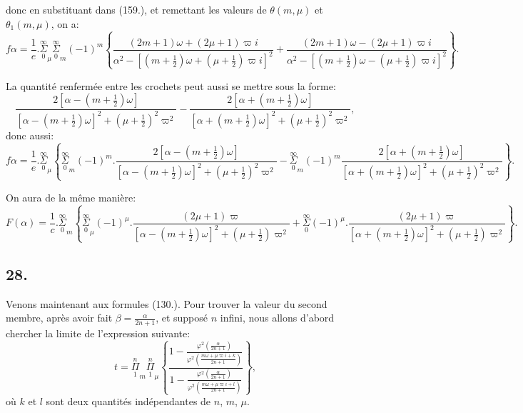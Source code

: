 \documentclass{article}
\begin{document}
donc en substituant dans (159.), et remettant les valeurs de $\theta(m,\mu)$ et $\theta_{1}(m,\mu)$, on a:
\[ f\alpha=\frac{1}{e}.\overset{\infty}{\underset{0}{\Sigma}}_{\mu}\overset{\infty}{\underset{0}{\Sigma}}_{m}(-1)^{m}\left\{\frac{(2m+1)\omega+(2\mu+1)\varpi i}{\alpha^{2}-[(m+\tfrac{1}{2})\omega+(\mu+\tfrac{1}{2})\varpi i]^{2}}+\frac{(2m+1)\omega-(2\mu+1)\varpi i}{\alpha^{2}-[(m+\tfrac{1}{2})\omega-(\mu+\tfrac{1}{2})\varpi i]^{2}}\right\}. \tag{160.} \]

La quantité renfermée entre les crochets peut aussi se mettre sous la forme:
\[ \frac{2[\alpha-(m+\tfrac{1}{2})\omega]}{[\alpha-(m+\tfrac{1}{2})\omega]^{2}+(\mu+\tfrac{1}{2})^{2}\varpi^{2}}-\frac{2[\alpha+(m+\tfrac{1}{2})\omega]}{[\alpha+(m+\tfrac{1}{2})\omega]^{2}+(\mu+\tfrac{1}{2})^{2}\varpi^{2}}, \]
donc aussi:
\[ f\alpha=\frac{1}{e}.\overset{\infty}{\underset{0}{\Sigma}}_{\mu}\left\{\overset{\infty}{\underset{0}{\Sigma}}_{m}(-1)^{m}.\frac{2[\alpha-(m+\tfrac{1}{2})\omega]}{[\alpha-(m+\tfrac{1}{2})\omega]^{2}+(\mu+\tfrac{1}{2})^{2}\varpi^{2}}-\overset{\infty}{\underset{0}{\Sigma}}_{m}(-1)^{m}\frac{2[\alpha+(m+\tfrac{1}{2})\omega]}{[\alpha+(m+\tfrac{1}{2})\omega]^{2}+(\mu+\tfrac{1}{2})^{2}\varpi^{2}}\right\}. \tag{161.} \]

On aura de la même manière:
\[ F(\alpha)=\frac{1}{c}.\overset{\infty}{\underset{0}{\Sigma}}_{m}\left\{\overset{\infty}{\underset{0}{\Sigma}}_{\mu}(-1)^{\mu}.\frac{(2\mu+1)\varpi}{[\alpha-(m+\tfrac{1}{2})\omega]^{2}+(\mu+\tfrac{1}{2})\varpi^{2}}+\overset{\infty}{\underset{0}{\Sigma}}(-1)^{\mu}.\frac{(2\mu+1)\varpi}{[\alpha+(m+\tfrac{1}{2})\omega]^{2}+(\mu+\tfrac{1}{2})\varpi^{2}}\right\}. \tag{162.} \]

\subsection*{28.}

Venons maintenant aux formules (130.). Pour trouver la valeur du second membre, après avoir fait $\beta=\frac{\alpha}{2n+1}$, et supposé $n$ infini, nous allons d'abord chercher la limite de l'expression suivante:
\[ t=\overset{n}{\underset{1}{\Pi}}_{m}\overset{n}{\underset{1}{\Pi}}_{\mu}\left\{\frac{1-\frac{\varphi^{2}\left(\frac{\alpha}{2n+1}\right)}{\varphi^{2}\left(\frac{m\omega+\mu\varpi i+k}{2n+1}\right)}}{1-\frac{\varphi^{2}\left(\frac{\alpha}{2n+1}\right)}{\varphi^{2}\left(\frac{m\omega+\mu\varpi i+l}{2n+1}\right)}}\right\}, \tag{163.} \]
où $k$ et $l$ sont deux quantités indépendantes de $n$, $m$, $\mu$.
\end{document}
